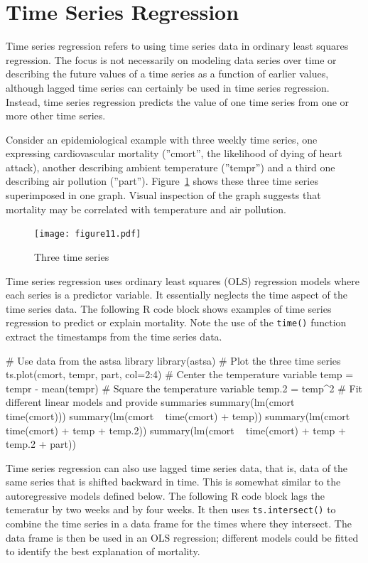 \section{Time Series Regression}

Time series regression refers to using time series data in ordinary least squares regression. The focus is not necessarily on modeling data series over time or describing the future values of a time series as a function of earlier values, although lagged time series can certainly be used in time series regression. Instead, time series regression predicts the value of one time series from one or more other time series. 

Consider an epidemiological example with three weekly time series, one expressing cardiovascular mortality (''cmort'', the likelihood of dying of heart attack), another describing ambient temperature (''tempr'') and a third one describing air pollution (''part''). Figure~\ref{fig:figure11} shows these three time series superimposed in one graph. Visual inspection of the graph suggests that mortality may be correlated with temperature and air pollution.

\begin{figure}
\centering
\texttt{[image: figure11.pdf]}
\caption{Three time series}
\label{fig:figure11}
\end{figure}

Time series regression uses ordinary least squares (OLS) regression models where each series is a predictor variable. It essentially neglects the time aspect of the time series data. The following R code block shows examples of time series regression to predict or explain mortality. Note the use of the \texttt{time()} function extract the timestamps from the time series data.

\begin{samepage}
\begin{Rcode}
# Use data from the astsa library
library(astsa)
# Plot the three time series
ts.plot(cmort, tempr, part, col=2:4)
# Center the temperature variable
temp = tempr - mean(tempr)
# Square the temperature variable
temp.2 = temp^2
# Fit different linear models and provide summaries
summary(lm(cmort ~ time(cmort)))
summary(lm(cmort ~ time(cmort) + temp))
summary(lm(cmort ~ time(cmort) + temp + temp.2))
summary(lm(cmort ~ time(cmort) + temp + temp.2 + part))
\end{Rcode}
\end{samepage}

Time series regression can also use lagged time series data, that is, data of the same series that is shifted backward in time. This is somewhat similar to the autoregressive models defined below. The following R code block lags the temeratur by two weeks and by four weeks. It then uses \texttt{ts.intersect()} to combine the time series in a data frame for the times where they intersect. The data frame is then be used in an OLS regression; different models could be fitted to identify the best explanation of mortality.

